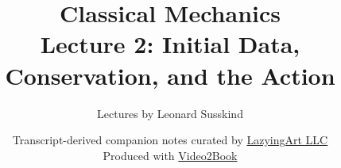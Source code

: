 \documentclass[11pt,oneside]{book}
\begin{document}
\hypersetup{pageanchor=false}
\frontmatter
\title{Classical Mechanics\\[0.45em]
\large Lecture 2: Initial Data, Conservation, and the Action}
\author{Lectures by Leonard Susskind}
\date{Transcript-derived companion notes curated by
\href{https://lazying.art}{LazyingArt LLC}\\[0.35em]
\small Produced with
\href{https://github.com/lachlanchen/Video2Book}{Video2Book}}
\maketitle
\hypersetup{pageanchor=true}
\mainmatter

\end{document}
